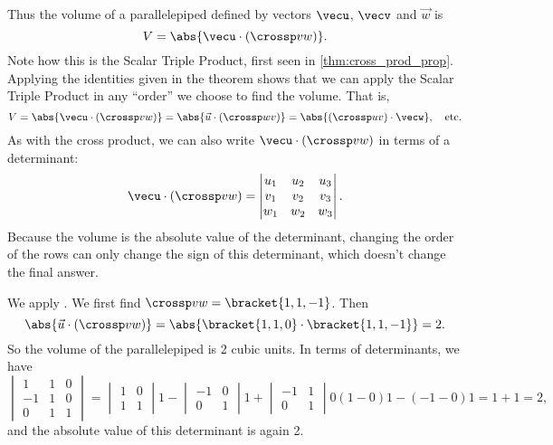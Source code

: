 %
%
%
%
%

Thus the volume of a parallelepiped defined by vectors $\vecu$, $\vecv$ and $\vec w$ is
\begin{equation}
V = \abs{\vecu\cdot (\crossp vw)}.\label{eq:crossp2}
\end{equation}
Note how this is the Scalar Triple Product, first seen in \autoref{thm:cross_prod_prop}. Applying the identities given in the theorem shows that we can apply the Scalar Triple Product in any ``order'' we choose to find the volume. That is,
\[V = \abs{\vecu\cdot(\crossp vw)} = \abs{\vec u\cdot (\crossp wv)} = \abs{(\crossp uv)\cdot \vecw},\quad \text{etc.}\]
As with the cross product, we can also write $\vecu\cdot(\crossp vw)$ in terms of a determinant:
\[
 \vecu\cdot(\crossp vw)=
 \begin{vmatrix}u_1&u_2&u_3\\v_1&v_2&v_3\\w_1&w_2&w_3\end{vmatrix}.
\]
Because the volume is the absolute value of the determinant, changing the order of the rows can only change the sign of this determinant, which doesn't change the final answer.


{We apply . We first find $\crossp vw =\bracket{1,1,-1}$. Then
\[\abs{\vec u\cdot(\crossp vw)} = \abs{\bracket{1,1,0}\cdot \bracket{1,1,-1}} = 2.\]
So the volume of the parallelepiped is 2 cubic units.  In terms of determinants, we have
\[
 \begin{vmatrix}1&1&0\\-1&1&0\\0&1&1\end{vmatrix}
 =\begin{vmatrix}1&0\\1&1\end{vmatrix}1
 -\begin{vmatrix}-1&0\\0&1\end{vmatrix}1
 +\begin{vmatrix}-1&1\\0&1\end{vmatrix}0
 (1-0)1-(-1-0)1
 =1+1
 =2,
\]
and the absolute value of this determinant is again 2.}

